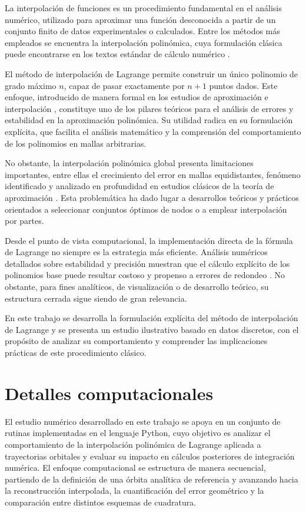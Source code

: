 \documentclass[reprint,amsmath,amssymb,aps]{revtex4-2}
\begin{document}
La interpolación de funciones es un procedimiento fundamental en el análisis numérico, utilizado para aproximar una función desconocida a partir de un conjunto finito de datos experimentales o calculados. Entre los métodos más empleados se encuentra la interpolación polinómica, cuya formulación clásica puede encontrarse en los textos estándar de cálculo numérico \cite{BurdenFaires, Atkinson}.

El método de interpolación de Lagrange permite construir un único polinomio de grado máximo $n$, capaz de pasar exactamente por $n+1$ puntos dados. Este enfoque, introducido de manera formal en los estudios de aproximación e interpolación \cite{Runge1901}, constituye uno de los pilares teóricos para el análisis de errores y estabilidad en la aproximación polinómica. Su utilidad radica en su formulación explícita, que facilita el análisis matemático y la comprensión del comportamiento de los polinomios en mallas arbitrarias.

No obstante, la interpolación polinómica global presenta limitaciones importantes, entre ellas el crecimiento del error en mallas equidistantes, fenómeno identificado y analizado en profundidad en estudios clásicos de la teoría de aproximación \cite{Trefethen2013}. Esta problemática ha dado lugar a desarrollos teóricos y prácticos orientados a seleccionar conjuntos óptimos de nodos o a emplear interpolación por partes.

Desde el punto de vista computacional, la implementación directa de la fórmula de Lagrange no siempre es la estrategia más eficiente. Análisis numéricos detallados sobre estabilidad y precisión muestran que el cálculo explícito de los polinomios base puede resultar costoso y propenso a errores de redondeo \cite{NumericalRecipes}. No obstante, para fines analíticos, de visualización o de desarrollo teórico, su estructura cerrada sigue siendo de gran relevancia.

En este trabajo se desarrolla la formulación explícita del método de interpolación de Lagrange y se presenta un estudio ilustrativo basado en datos discretos, con el propósito de analizar su comportamiento y comprender las implicaciones prácticas de este procedimiento clásico.
	
	\section{Detalles computacionales}
	
	El estudio numérico desarrollado en este trabajo se apoya en un conjunto de rutinas implementadas en el lenguaje Python, cuyo objetivo es analizar el comportamiento de la interpolación polinómica de Lagrange aplicada a trayectorias orbitales y evaluar su impacto en cálculos posteriores de integración numérica. El enfoque computacional se estructura de manera secuencial, partiendo de la definición de una órbita analítica de referencia y avanzando hacia la reconstrucción interpolada, la cuantificación del error geométrico y la comparación entre distintos esquemas de cuadratura.
	
\end{document}
